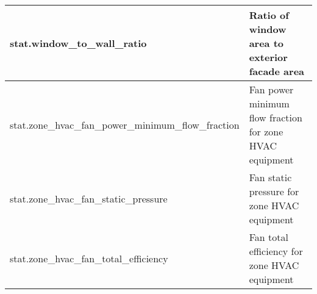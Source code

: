 \begin{center}
\begin{longtable}{|p{3in}|p{3in}|}
stat.window\_to\_wall\_ratio                               & Ratio of window area to exterior facade area                                                                          \\ \hline
stat.zone\_hvac\_fan\_power\_minimum\_flow\_fraction       & Fan power minimum flow fraction for zone HVAC equipment                                                               \\ \hline
stat.zone\_hvac\_fan\_static\_pressure                     & Fan static pressure for zone HVAC equipment                                                                           \\ \hline
stat.zone\_hvac\_fan\_total\_efficiency                    & Fan total efficiency for zone HVAC equipment                                                            \\ \hline             
\end{longtable}
\end{center}